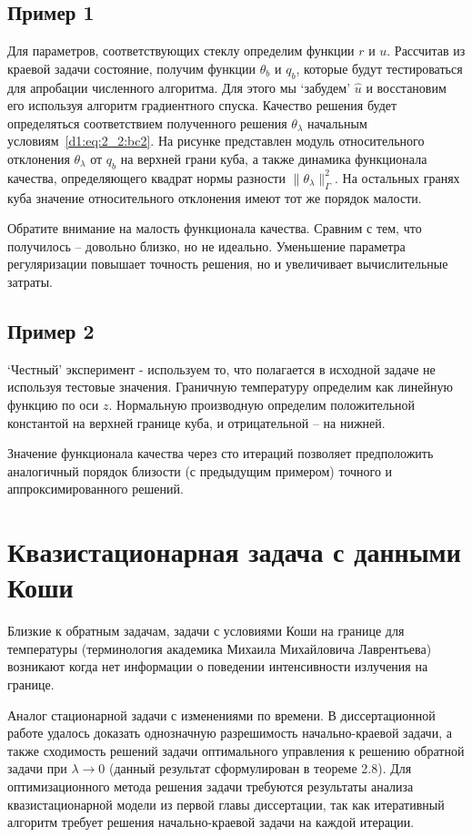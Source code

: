 \documentclass[8pt,a4paper]{article}
\begin{document}
    \subsection*{Пример 1}
    Для параметров, соответствующих стеклу определим функции $r$ и $u$.
    Рассчитав из краевой задачи состояние, получим функции $\theta_b$ и $q_b$, которые будут
    тестироваться для апробации численного алгоритма.
    Для этого мы `забудем' $\hat u$ и восстановим его используя алгоритм градиентного спуска.
    Качество решения будет определяться соответствием полученного решения $\theta_\lambda$ начальным
    условиям~\eqref{d1:eq:2_2:bc2}.
    На рисунке представлен модуль относительного отклонения $\theta_\lambda$
    от $q_b$ на верхней грани куба, а также динамика
    функционала качества, определяющего квадрат нормы разности $\|\theta_\lambda\|^2_\Gamma$.
    На остальных гранях куба значение относительного отклонения имеют тот же порядок малости.

    Обратите внимание на малость функционала качества.
    Сравним с тем, что получилось -- довольно близко, но не идеально.
    Уменьшение параметра регуляризации повышает точность решения,
    но и увеличивает вычислительные затраты.


    \subsection*{Пример 2}
    `Честный' эксперимент - используем то, что полагается в исходной задаче не используя тестовые значения.
    Граничную температуру определим как линейную функцию по оси $z$.
    Нормальную производную определим положительной константой на верхней границе куба, и отрицательной -- на нижней.

    Значение функционала качества через сто итераций позволяет предположить аналогичный порядок
    близости (с предыдущим примером) точного и аппроксимированного решений.


    \section*{Квазистационарная задача с данными Коши}
    Близкие к обратным задачам, задачи с условиями Коши на границе для температуры
    (терминология академика Михаила Михайловича Лаврентьева) возникают когда нет информации
    о поведении интенсивности излучения на границе.

    Аналог стационарной задачи с изменениями по времени.
    В диссертационной работе удалось доказать однозначную разрешимость начально-краевой задачи,
    а также сходимость решений задачи оптимального управления к решению обратной задачи при $\lambda \to 0$
    (данный результат сформулирован в теореме 2.8).
    Для оптимизационного метода решения задачи требуются результаты анализа квазистационарной
    модели из первой главы диссертации, так как итеративный алгоритм требует
    решения начально-краевой задачи на каждой итерации.
\end{document}
